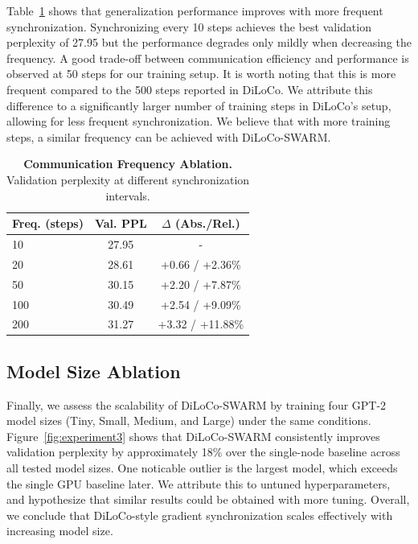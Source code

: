 \documentclass{article}
\begin{document}
Table~\ref{tab:experiment2} shows that generalization performance improves with more frequent synchronization. Synchronizing every 10 steps achieves the best validation perplexity of 27.95 but the performance degrades only mildly when decreasing the frequency. A good trade-off between communication efficiency and performance is observed at 50 steps for our training setup. It is worth noting that this is more frequent compared to the 500 steps reported in DiLoCo. We attribute this difference to a significantly larger number of training steps in DiLoCo's setup, allowing for less frequent synchronization. We believe that with more training steps, a similar frequency can be achieved with DiLoCo-SWARM.

\begin{table}[ht]
\centering
\begin{tabular}{lcc}
\toprule
\textbf{Freq. (steps)} & \textbf{Val. PPL} & \textbf{$\Delta$ (Abs./Rel.)} \\ 
\midrule
10 & 27.95 & - \\
20 & 28.61 & +0.66 / +2.36\% \\
50 & 30.15 & +2.20 / +7.87\% \\
100 & 30.49 & +2.54 / +9.09\% \\
200 & 31.27 & +3.32 / +11.88\% \\
\bottomrule
\end{tabular}
\caption{\textbf{Communication Frequency Ablation.} Validation perplexity at different synchronization intervals.}
\label{tab:experiment2}
\end{table}

\subsection{Model Size Ablation}

Finally, we assess the scalability of DiLoCo-SWARM by training four GPT-2 model sizes (Tiny, Small, Medium, and Large) under the same conditions. Figure~\ref{fig:experiment3} shows that DiLoCo-SWARM consistently improves validation perplexity by approximately 18\% over the single-node baseline across all tested model sizes. One noticable outlier is the largest model, which exceeds the single GPU baseline later. We attribute this to untuned hyperparameters, and hypothesize that similar results could be obtained with more tuning. Overall, we conclude that DiLoCo-style gradient synchronization scales effectively with increasing model size.
\end{document}
